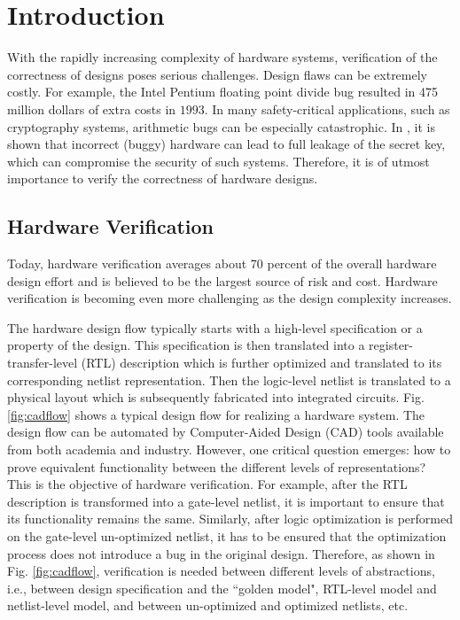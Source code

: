 \chapter{Introduction} \label{ch:intro}


With the rapidly increasing complexity of hardware systems,
verification of the correctness of  designs poses serious challenges. 
Design flaws can be extremely costly. For example, the Intel Pentium 
floating point divide bug resulted in 475 million dollars of extra
costs in $1993$. %
In many safety-critical applications, such as cryptography systems,
arithmetic bugs can be especially catastrophic. In
\cite{crypto:bug_attacks}, it is shown that incorrect (buggy) hardware
can lead to full leakage of the secret key, which can 
compromise the security of such systems. Therefore, it is
of utmost importance to verify the correctness of hardware designs. 


\section{Hardware Verification}
Today, hardware verification averages about 70 percent of the overall
hardware design effort and is believed to be the largest source of risk and
cost. Hardware verification is becoming even more challenging as the
design complexity increases. 

The hardware design flow typically starts with a high-level
specification or a property of the design. This specification
is then translated into a register-transfer-level (RTL) description
which is further  optimized and translated to its corresponding
netlist representation.  Then the logic-level netlist is translated to
a physical layout which is subsequently fabricated into integrated
circuits.  Fig.\ref{fig:cadflow} shows a typical design flow for
realizing a hardware system. The design flow can be automated by
Computer-Aided Design (CAD) tools available from  both academia and
industry. However, one critical question emerges: how to prove
equivalent functionality between the different levels of
representations?  This is the objective of hardware verification. 
For example, after the RTL description is transformed into a
gate-level netlist, it is important to ensure that its functionality
remains the same. Similarly, after logic optimization is performed on
the gate-level un-optimized netlist, it has to be ensured that the
optimization process does not introduce a bug in the original design.  
Therefore, as shown in Fig. \ref{fig:cadflow}, verification is needed
between different levels of abstractions, i.e.,  between design
specification and the ``golden model", RTL-level model and netlist-level
model, and between un-optimized and optimized netlists, etc. 

